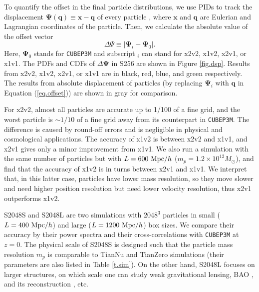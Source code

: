 \documentclass[10pt,twocolumn,reprint]{emulateapj}
\newcommand{\bs}{\boldsymbol}
\newcommand{\Msun}{M_\odot}
\begin{document}
To quantify the offset in the final particle distributions, we use PIDs to track the displacement ${\bs \Psi}({\bs q})\equiv{\bs x}-{\bs q}$ of every particle \citep{2017PhRvD..95d3501Y}, where ${\bs x}$ and ${\bs q}$ are Eulerian and Lagrangian coordinates of the particle. Then, we calculate the absolute value of the offset vector
\begin{equation}\label{eq.offset}
	\Delta\Psi\equiv|{\bs\Psi}_i-{\bs\Psi}_0|.
\end{equation}
Here, ${\bs\Psi}_0$ stands for {\tt CUBEP3M} and subscript $_i$ can stand for x2v2, x1v2, x2v1, or x1v1. The PDFs and CDFs of $\Delta\bs\Psi$ in S256 are shown in Figure \ref{fig.dsp}. Results from x2v2, x1v2, x2v1, or x1v1 are in black, red, blue, and green respectively. The results from absolute displacement of particles (by replacing ${\bs\Psi}_i$ with ${\bs q}$ in Equation (\ref{eq.offset})) are shown in gray for comparison.

For x2v2, almost all particles are accurate up to 1/100 of a fine grid, and the worst particle is $\sim 1/10$ of a fine grid away from its counterpart in {\tt CUBEP3M}. The difference is caused by round-off errors and is negligible in physical and cosmological applications. The accuracy of x1v2 is between x2v2 and x1v1, and x2v1 gives only a minor improvement from x1v1. We also run a simulation with the same number of particles but with $L=600\ {\rm Mpc}/h$ ($m_p=1.2\times 10^{12}\Msun$), and find that the accuracy of x1v2 is in turns between x2v1 and x1v1. We interpret that, in this latter case, particles have lower mass resolution, so they move slower and need higher position resolution but need lower velocity resolution, thus x2v1 outperforms x1v2.

S2048S and S2048L are two simulations with $2048^3$ particles in small ($L=400\ {\rm Mpc}/h$) and large ($L=1200\ {\rm Mpc}/h$) box sizes. We compare their accuracy by their power spectra and their cross-correlations with {\tt CUBEP3M} at $z=0$. The physical scale of S2048S is designed such that the particle mass resolution $m_p$ is comparable to TianNu and TianZero simulations (their parameters are also listed in Table \ref{t.sim}). On the other hand, S2048L focuses on larger structures, on which scale one can study weak gravitational lensing, BAO \citep{2005ApJ...633..560E}, and its reconstruction \citep{2007ApJ...664..675E,2017ApJ...841L..29W}, etc.
\end{document}
